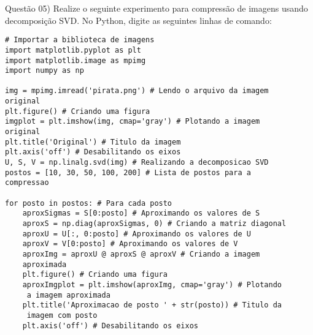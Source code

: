 
\noindent \textcolor{COLOR1}{Questão 05)} Realize o seguinte experimento para compressão de imagens
usando decomposição SVD. No Python, digite as seguintes linhas de comando:
\\

\begin{lstlisting}
# Importar a biblioteca de imagens
import matplotlib.pyplot as plt
import matplotlib.image as mpimg 
import numpy as np 

img = mpimg.imread('pirata.png') # Lendo o arquivo da imagem 
original
plt.figure() # Criando uma figura
imgplot = plt.imshow(img, cmap='gray') # Plotando a imagem 
original
plt.title('Original') # Titulo da imagem
plt.axis('off') # Desabilitando os eixos
U, S, V = np.linalg.svd(img) # Realizando a decomposicao SVD
postos = [10, 30, 50, 100, 200] # Lista de postos para a 
compressao

for posto in postos: # Para cada posto
    aproxSigmas = S[0:posto] # Aproximando os valores de S
    aproxS = np.diag(aproxSigmas, 0) # Criando a matriz diagonal
    aproxU = U[:, 0:posto] # Aproximando os valores de U
    aproxV = V[0:posto] # Aproximando os valores de V
    aproxImg = aproxU @ aproxS @ aproxV # Criando a imagem 
    aproximada
    plt.figure() # Criando uma figura
    aproxImgplot = plt.imshow(aproxImg, cmap='gray') # Plotando
     a imagem aproximada
    plt.title('Aproximacao de posto ' + str(posto)) # Titulo da
     imagem com posto
    plt.axis('off') # Desabilitando os eixos
\end{lstlisting}